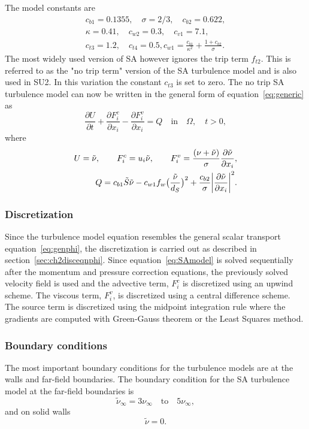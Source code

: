 The model constants are
\begin{align}
c_{b1} = 0.1355, \quad \sigma=2/3, \quad c_{b2} = 0.622, \nonumber \\
\kappa = 0.41, \quad c_{w2} = 0.3, \quad c_{v1} = 7.1, \\
c_{t3} = 1.2, \quad c_{t4} = 0.5, c_{w1} = \frac{c_{b1}}{\kappa^2} + \frac{1+c_{b2}}{\sigma}. \nonumber
\end{align}
The most widely used version of SA however ignores the trip term $f_{t2}$. This is referred to as the "no trip term" version of the SA turbulence model and is also used in SU2. In this variation the constant $c_{t3}$ is set to zero. The no trip SA turbulence model can now be written in the general form of equation~\ref{eq:generic} as 
\begin{equation*}
\frac{\partial U}{\partial t}  + \frac{\partial F^c_i}{\partial x_i}-\frac{\partial F^v_i}{\partial x_i}=Q \quad \text{in} \quad \Omega, \quad t>0,
\end{equation*}
where
\begin{align}
    U= \Tilde{\nu}, \qquad
    F^c_i = u_i \Tilde{\nu}, \qquad
    F^v_i = \frac{(\nu + \Tilde{\nu})}{\sigma}\frac{\partial \Tilde{\nu}}{\partial x_i} \nonumber, \\
    Q =  c_{b1}\Tilde{S}\Tilde{\nu} -c_{w1}f_w\big(\frac{\Tilde{\nu}}{d_S} \big)^2 + \frac{c_{b2}}{\sigma}\bigg|\frac{\partial \Tilde{\nu}}{\partial x_i}\bigg|^2.
    \label{eq:SAmodel}
\end{align}{}

\subsubsection{Discretization}
Since the turbulence model equation resembles the general scalar transport equation~\ref{eq:genphi}, the discretization is carried out as described in section~\ref{sec:ch2disceqnphi}. Since equation~\ref{eq:SAmodel} is solved sequentially after the momentum and pressure correction equations, the previously solved velocity field is used and the advective term, $F^c_i$ is discretized using an upwind scheme. The viscous term, $F^v_i$, is discretized using a central difference scheme. The source term is discretized using the midpoint integration rule where the gradients are computed with Green-Gauss theorem or the Least Squares method. 

\subsubsection{Boundary conditions}
The most important boundary conditions for the turbulence models are at the walls and far-field boundaries. The boundary condition for the SA turbulence model at the far-field boundaries is
\begin{equation}
\tilde{\nu}_{\infty} = 3 \nu_{\infty}\quad \text{to}\quad 5\nu_{\infty}, 
\end{equation}
and on solid walls 
\begin{equation}
\tilde{\nu} = 0.
\end{equation}
